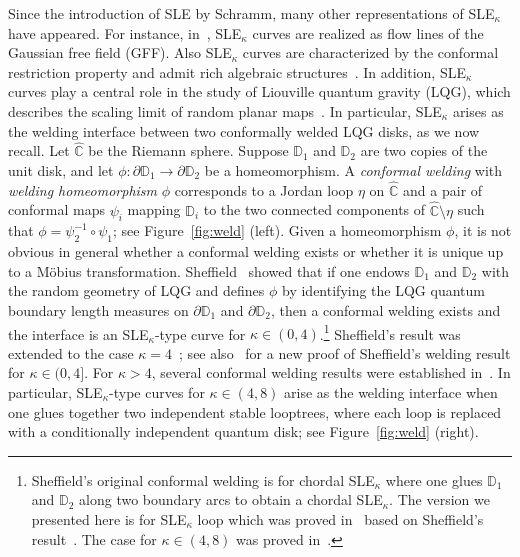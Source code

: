 \documentclass[a4paper]{article}
\numberwithin{equation}{section}
\numberwithin{equation}{section}
\renewcommand{\1}{\mathbf{1}}
\begin{document}
Since the introduction of SLE by Schramm, many other representations of SLE$_\kappa$ have appeared. For instance, in~\cite{SS-contour, Dubedat-SLE-GFF, IG1, IG4}, SLE$_\kappa$ curves are realized as flow lines of the Gaussian free field (GFF). Also SLE$_\kappa$ curves are characterized by the conformal restriction property and admit rich algebraic structures~\cite{LSW-restriction, Werner-sle-loop, baverez2024cft}. In addition, SLE$_\kappa$ curves play a central role in the study of Liouville quantum gravity (LQG), which describes the scaling limit of random planar maps~\cite{Sheffield-zipper, DMS21-LQG-MRT}. In particular, SLE$_\kappa$ arises as the welding interface between two conformally welded LQG disks, as we now recall. Let $\widehat{\mathbb{C}}$ be the Riemann sphere. Suppose $\mathbb{D}_1$ and $\mathbb{D}_2$ are two copies of the unit disk, and let $\phi: \partial \mathbb{D}_1 \to \partial \mathbb{D}_2$ be a homeomorphism. A \textit{conformal welding} with \textit{welding homeomorphism} $\phi$ corresponds to a Jordan loop $\eta$ on $\widehat{\mathbb{C}}$ and a pair of conformal maps $\psi_i$ mapping $\mathbb{D}_i$ to the two connected components of $\widehat{\mathbb{C}} \setminus \eta$ such that $\phi = \psi_2^{-1} \circ \psi_1$; see Figure~\ref{fig:weld} (left). Given a homeomorphism $\phi$, it is not obvious in general whether a conformal welding exists or whether it is unique up to a M\"obius transformation. Sheffield~\cite{Sheffield-zipper} showed that if one endows $\mathbb{D}_1$ and $\mathbb{D}_2$ with the random geometry of LQG and defines $\phi$ by identifying the LQG quantum boundary length measures on $\partial \mathbb D_1$ and $\partial \mathbb D_2$, then a conformal welding exists and the interface is an SLE$_\kappa$-type curve for $\kappa \in (0,4)$.\footnote{Sheffield's original conformal welding is for chordal SLE$_\kappa$ where one glues $\mathbb{D}_1$ and $\mathbb{D}_2$ along two boundary arcs to obtain a chordal SLE$_\kappa$. The version we presented here is for SLE$_\kappa$ loop which was proved in~\cite{AHS-loop} based on Sheffield's result~\cite{Sheffield-zipper}. The case for $\kappa \in (4,8)$ was proved in~\cite{ACSW-loop}.} Sheffield's result was extended to the case $\kappa = 4$~\cite{HP-critical-welding}; see also~\cite{Baverez-welding} for a new proof of Sheffield's welding result for $\kappa \in (0,4]$. For $\kappa > 4$, several conformal welding results were established in~\cite{DMS21-LQG-MRT}. In particular, SLE$_\kappa$-type curves for $\kappa \in (4,8)$ arise as the welding interface when one glues together two independent stable looptrees, where each loop is replaced with a conditionally independent quantum disk; see Figure~\ref{fig:weld} (right).
\end{document}
